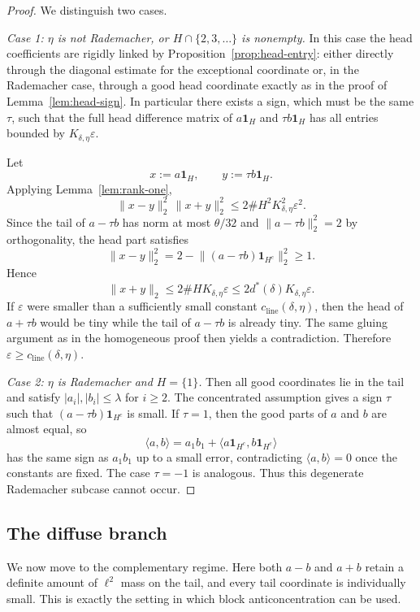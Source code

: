 \documentclass[11pt]{amsart}
\numberwithin{equation}{section}
\theoremstyle{definition}
\theoremstyle{remark}
\newcommand{\eps}{\varepsilon}
\newcommand{\norm}[1]{\lVert #1 \rVert}
\newcommand{\ip}[2]{\langle #1,#2\rangle}
\begin{document}
\begin{proof}
We distinguish two cases.

\smallskip
\noindent\emph{Case 1: $\eta$ is not Rademacher, or $H\cap\{2,3,\dots\}$ is
nonempty.}
In this case the head coefficients are rigidly linked by
Proposition~\ref{prop:head-entry}: either directly through the diagonal
estimate for the exceptional coordinate or, in the Rademacher case, through a
good head coordinate exactly as in the proof of Lemma~\ref{lem:head-sign}.  In
particular there exists a sign, which must be the same $\tau$, such that the
full head difference matrix of $a\mathbf 1_H$ and $\tau b\mathbf 1_H$ has all
entries bounded by $K_{\delta,\eta}\eps$.

Let
\[
x:=a\mathbf 1_H,
\qquad
y:=\tau b\mathbf 1_H.
\]
Applying Lemma~\ref{lem:rank-one},
\[
\norm{x-y}_2^2\,\norm{x+y}_2^2
\le 2\#H^2 K_{\delta,\eta}^2\eps^2.
\]
Since the tail of $a-\tau b$ has norm at most $\theta/32$ and
$\norm{a-\tau b}_2^2=2$ by orthogonality, the head part satisfies
\[
\norm{x-y}_2^2
=2-\norm{(a-\tau b)\mathbf 1_{H^c}}_2^2
\ge 1.
\]
Hence
\[
\norm{x+y}_2\le 2\#H K_{\delta,\eta}\eps
\le 2d^*(\delta)K_{\delta,\eta}\eps.
\]
If $\eps$ were smaller than a sufficiently small constant
$c_{\mathrm{line}}(\delta,\eta)$, then the head of $a+\tau b$ would be tiny
while the tail of $a-\tau b$ is already tiny.  The same gluing argument as in
the homogeneous proof then yields a contradiction.  Therefore
$\eps\ge c_{\mathrm{line}}(\delta,\eta)$.

\smallskip
\noindent\emph{Case 2: $\eta$ is Rademacher and $H=\{1\}$.}
Then all good coordinates lie in the tail and satisfy
$|a_i|,|b_i|\le \lambda$ for $i\ge2$.  The concentrated assumption gives a sign
$\tau$ such that $(a-\tau b)\mathbf 1_{H^c}$ is small.  If $\tau=1$, then the
good parts of $a$ and $b$ are almost equal, so
\[
\ip{a}{b}
=a_1b_1+\ip{a\mathbf 1_{H^c}}{b\mathbf 1_{H^c}}
\]
has the same sign as $a_1b_1$ up to a small error, contradicting
$\ip{a}{b}=0$ once the constants are fixed.  The case $\tau=-1$ is analogous.
Thus this degenerate Rademacher subcase cannot occur.
\end{proof}

\subsection{The diffuse branch}

We now move to the complementary regime.  Here both $a-b$ and $a+b$ retain a
definite amount of $\ell^2$ mass on the tail, and every tail coordinate is
individually small.  This is exactly the setting in which block
anticoncentration can be used.
\end{document}
